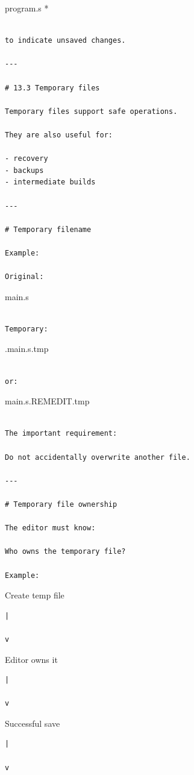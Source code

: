 \documentclass[
  oneside,
  openany]{book}
\begin{document}
program.s *

\begin{verbatim}

to indicate unsaved changes.

---

# 13.3 Temporary files

Temporary files support safe operations.

They are also useful for:

- recovery
- backups
- intermediate builds

---

# Temporary filename

Example:

Original:
\end{verbatim}

main.s

\begin{verbatim}

Temporary:
\end{verbatim}

.main.s.tmp

\begin{verbatim}

or:
\end{verbatim}

main.s.REMEDIT.tmp

\begin{verbatim}

The important requirement:

Do not accidentally overwrite another file.

---

# Temporary file ownership

The editor must know:

Who owns the temporary file?

Example:
\end{verbatim}

Create temp file

\begin{verbatim}
|

v
\end{verbatim}

Editor owns it

\begin{verbatim}
|

v
\end{verbatim}

Successful save

\begin{verbatim}
|

v
\end{verbatim}
\end{document}
